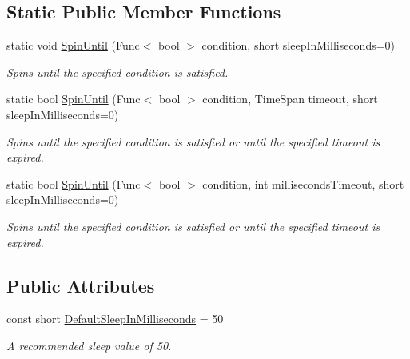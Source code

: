 \subsection*{Static Public Member Functions}
\begin{DoxyCompactItemize}
\item 
static void \hyperlink{structCqrs_1_1Infrastructure_1_1SpinWait_ae6b5bdef734568b515fa8d2ed04af9bb}{Spin\+Until} (Func$<$ bool $>$ condition, short sleep\+In\+Milliseconds=0)
\begin{DoxyCompactList}\small\item\em Spins until the specified condition is satisfied. \end{DoxyCompactList}\item 
static bool \hyperlink{structCqrs_1_1Infrastructure_1_1SpinWait_a3b8ad06e785634704c7555bd8d0f1ac9}{Spin\+Until} (Func$<$ bool $>$ condition, Time\+Span timeout, short sleep\+In\+Milliseconds=0)
\begin{DoxyCompactList}\small\item\em Spins until the specified condition is satisfied or until the specified timeout is expired. \end{DoxyCompactList}\item 
static bool \hyperlink{structCqrs_1_1Infrastructure_1_1SpinWait_a9132e663f1bd0c28ec846cf026ab1c5f}{Spin\+Until} (Func$<$ bool $>$ condition, int milliseconds\+Timeout, short sleep\+In\+Milliseconds=0)
\begin{DoxyCompactList}\small\item\em Spins until the specified condition is satisfied or until the specified timeout is expired. \end{DoxyCompactList}\end{DoxyCompactItemize}
\subsection*{Public Attributes}
\begin{DoxyCompactItemize}
\item 
const short \hyperlink{structCqrs_1_1Infrastructure_1_1SpinWait_a1d7345222f47db5e45af305591b92da5}{Default\+Sleep\+In\+Milliseconds} = 50
\begin{DoxyCompactList}\small\item\em A recommended sleep value of 50. \end{DoxyCompactList}\end{DoxyCompactItemize}
